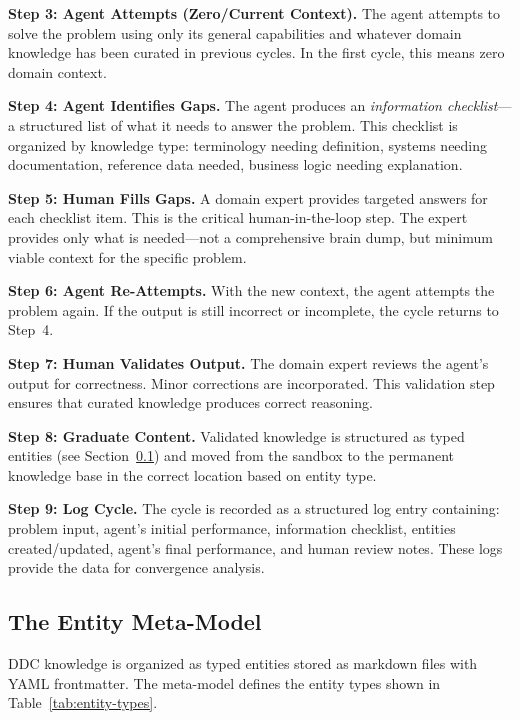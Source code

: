 \documentclass[11pt,a4paper]{article}
\begin{document}
\textbf{Step 3: Agent Attempts (Zero/Current Context).} The agent attempts to solve the problem using only its general capabilities and whatever domain knowledge has been curated in previous cycles. In the first cycle, this means zero domain context.

\textbf{Step 4: Agent Identifies Gaps.} The agent produces an \emph{information checklist}---a structured list of what it needs to answer the problem. This checklist is organized by knowledge type: terminology needing definition, systems needing documentation, reference data needed, business logic needing explanation.

\textbf{Step 5: Human Fills Gaps.} A domain expert provides targeted answers for each checklist item. This is the critical human-in-the-loop step. The expert provides only what is needed---not a comprehensive brain dump, but minimum viable context for the specific problem.

\textbf{Step 6: Agent Re-Attempts.} With the new context, the agent attempts the problem again. If the output is still incorrect or incomplete, the cycle returns to Step~4.

\textbf{Step 7: Human Validates Output.} The domain expert reviews the agent's output for correctness. Minor corrections are incorporated. This validation step ensures that curated knowledge produces correct reasoning.

\textbf{Step 8: Graduate Content.} Validated knowledge is structured as typed entities (see Section~\ref{sec:metamodel}) and moved from the sandbox to the permanent knowledge base in the correct location based on entity type.

\textbf{Step 9: Log Cycle.} The cycle is recorded as a structured log entry containing: problem input, agent's initial performance, information checklist, entities created/updated, agent's final performance, and human review notes. These logs provide the data for convergence analysis.

\subsection{The Entity Meta-Model}
\label{sec:metamodel}

DDC knowledge is organized as typed entities stored as markdown files with YAML frontmatter. The meta-model defines the entity types shown in Table~\ref{tab:entity-types}.
\end{document}
